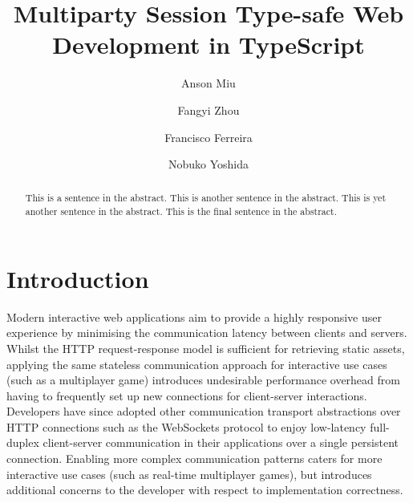 \documentclass[submission,copyright,creativecommons]{eptcs}
\title{Multiparty Session Type-safe Web Development in TypeScript}
\author{Anson Miu
\institute{Imperial College London}
\and
Fangyi Zhou
\institute{Imperial College London}
\and
Francisco Ferreira
\institute{Imperial College London}
\and
Nobuko Yoshida
\institute{Imperial College London}
}
\begin{document}
\maketitle

\begin{abstract}



This is a sentence in the abstract.
This is another sentence in the abstract.
This is yet another sentence in the abstract.
This is the final sentence in the abstract.





\end{abstract}

\section{Introduction}

Modern interactive web applications aim to provide a highly responsive user experience by minimising the communication latency between clients and servers. 
Whilst the HTTP request-response model is sufficient for retrieving static assets, applying the same stateless communication approach for interactive use cases (such as a multiplayer game) introduces undesirable performance overhead from having to frequently set up new connections for client-server interactions. 
Developers have since adopted other communication transport abstractions over HTTP connections such as the WebSockets protocol \cite{WebSocketRFC} to enjoy low-latency full-duplex client-server communication in their applications over a single persistent connection. 
Enabling more complex communication patterns caters for more interactive use cases (such as real-time multiplayer games), but introduces additional concerns to the developer with respect to implementation correctness.
\end{document}
